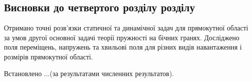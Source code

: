 \subsection{Висновки до четвертого розділу розділу}
Отримано точні розв'язки статичної та динамічної задач для прямокутної області за умов другої основної задачі теорії пружності на бічних гранях.
Досліджено поля переміщень, напружень та хвильові поля для різних видів навантаження і розмірів прямокутної області.

Встановлено ...(за результатами численних результатов).